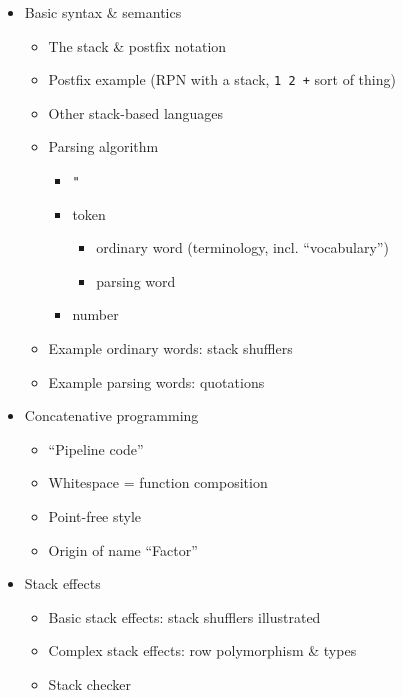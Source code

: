 \documentclass[11pt]{article}
\begin{document}
\begin{itemize}

\item Basic syntax \& semantics
      \begin{itemize}
        \item The stack \& postfix notation
        \item Postfix example (RPN with a stack, \verb|1 2 +| sort of thing)
        \item Other stack-based languages
        \item Parsing algorithm
              \begin{itemize}
                \item \verb|"|
                \item token
                      \begin{itemize}
                        \item ordinary word (terminology, incl. ``vocabulary'')
                        \item parsing word
                      \end{itemize}
                \item number
              \end{itemize}
        \item Example ordinary words: stack shufflers
        \item Example parsing words: quotations
      \end{itemize}

\item Concatenative programming
      \begin{itemize}
        \item ``Pipeline code''
        \item Whitespace = function composition
        \item Point-free style
        \item Origin of name ``Factor''
      \end{itemize}

\item Stack effects
      \begin{itemize}
        \item Basic stack effects: stack shufflers illustrated
        \item Complex stack effects: row polymorphism \& types
        \item Stack checker
      \end{itemize}


\end{itemize}
\end{document}
